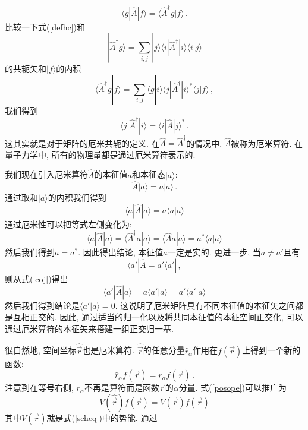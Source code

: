 \documentclass[b5paper]{book}
\begin{document}
\begin{equation}\label{defhc}
\langle g|\hat{A}|f\rangle =\langle \hat{A}^\dagger g|f\rangle\,.
\end{equation}
比较一下式(\ref{defhc})和
\begin{equation}
|\hat{A}^\dagger g\rangle =\sum_{i,j}|j\rangle\langle i|\hat{A}^\dagger|i\rangle\langle i|j\rangle
\end{equation}
的共轭矢和$|f\rangle$的内积 
\begin{equation}
\langle \hat{A}^\dagger g|f\rangle=\sum_{i,j}\langle g|i\rangle \langle j|\hat{A}^\dagger|i\rangle^*\langle j|f\rangle\,,
\end{equation}
我们得到
\begin{equation}
\langle j|\hat{A}^\dagger|i\rangle =\langle i|\hat{A}|j\rangle^*\,.
\end{equation}
这其实就是对于矩阵的厄米共轭的定义. 在$\hat{A}=\hat{A}^\dagger$的情况中, $\hat{A}$被称为厄米算符. 在量子力学中, 所有的物理量都是通过厄米算符表示的.

我们现在引入厄米算符$\hat{A}$的本征值$a$和本征态$|a\rangle$:
\begin{equation}
\hat{A}|a\rangle= a |a\rangle\,.
\end{equation}
通过取和$|a\rangle$的内积我们得到
\begin{equation}
\langle a|\hat{A}|a\rangle = a \langle a|a\rangle
\end{equation}
通过厄米性可以把等式左侧变化为:
\begin{equation}\label{coj}
\langle a|\hat{A}|a\rangle = \langle \hat{A}^\dagger a |a\rangle =\langle \hat{A}a|a\rangle =a^*\langle a|a \rangle
\end{equation}
然后我们得到$a=a^*$. 因此得出结论, 本征值$a$一定是实的. 更进一步, 当$a\neq a'$且有
\begin{equation}
\langle a'|\hat{A}=a'\langle a'|\,,
\end{equation}
则从式(\ref{coj})得出
\begin{equation}
\langle a'|\hat{A}|a\rangle = a\langle a'|a\rangle =a'\langle a'|a \rangle
\end{equation}
然后我们得到结论是$\langle a'|a\rangle =0$. 这说明了厄米矩阵具有不同本征值的本征矢之间都是互相正交的. 因此, 通过适当的归一化以及将共同本征值的本征空间正交化, 可以通过厄米算符的本征矢来搭建一组正交归一基.

很自然地, 空间坐标$\hat{\vec{r}}$也是厄米算符. $\hat{\vec{r}}$的任意分量$\hat{r}_\alpha$作用在$f(\vec{r})$上得到一个新的函数:
\begin{equation}\label{posope}
\hat{r}_\alpha f(\vec{r})=r_\alpha f(\vec{r})\,.
\end{equation}
注意到在等号右侧, $r_\alpha$不再是算符而是函数$\vec{r}$的$\alpha$分量. 式(\ref{posope})可以推广为
\begin{equation}
V(\hat{\vec{r}})f(\vec{r})=V(\vec{r})f(\vec{r})
\end{equation}
其中$V(\vec{r})$就是式(\ref{scheq})中的势能. 通过
\end{document}
